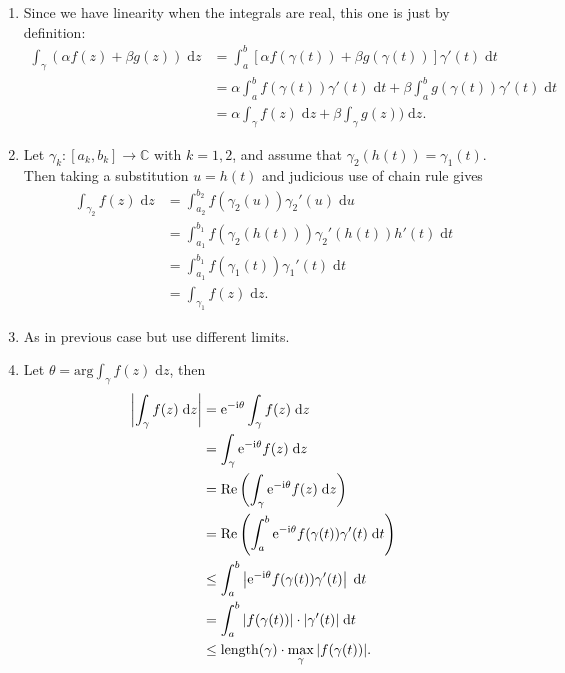 \documentclass[letter-paper]{tufte-book}
\newenvironment{proof}[1][Proof]{\begin{trivlist}
\item[\hskip \labelsep {\bfseries #1}]}{\end{trivlist}}
\newcommand{\ex}{\mathrm{e}}
\newcommand{\zi}{{\rm i}}
\begin{document}
\begin{proof}
  \begin{enumerate}
    \item Since we have linearity when the integrals are real, this one is just
    by definition:
    \begin{align*}
      \int_\gamma (\alpha f(z) + \beta g(z))\; \mathrm{d}z 
        &= \int^b_a [\alpha f(\gamma(t)) + \beta g(\gamma(t))]\gamma'(t)\; \mathrm{d}t\\
        &= \alpha \int^b_a f(\gamma(t)) \gamma'(t)\; \mathrm{d}t + \beta \int^b_a g(\gamma(t)) \gamma'(t)\; \mathrm{d}t\\
        & =\alpha \int_\gamma f(z)\; \mathrm{d}z + \beta \int_\gamma g(z))\; \mathrm{d}z.
    \end{align*}
    
    \item Let $\gamma_k : [a_k, b_k] \to \mathbb{C}$ with $k=1,2$, and assume
    that $\gamma_2(h(t)) = \gamma_1(t)$. Then taking a substitution $u = h(t)$
    and judicious use of chain rule gives
    \begin{align*}
      \int_{\gamma_2} f(z)\; \mathrm{d}z &= \int^{b_2}_{a_2} f(\gamma_2(u)) \gamma_2'(u)\; \mathrm{d}u \\
      &= \int^{b_1}_{a_1} f(\gamma_2(h(t))) \gamma_2'(h(t)) h'(t)\; \mathrm{d}t \\
      &= \int^{b_1}_{a_1} f(\gamma_1(t)) \gamma_1'(t)\; \mathrm{d}t \\
      &= \int_{\gamma_1} f(z)\; \mathrm{d}z.
    \end{align*}
    
    \item As in previous case but use different limits.
    
    \item Let $\theta = \mbox{arg} \int_\gamma f(z)\; \mathrm{d}z$, then
    \begin{align*}
      \left|\int_\gamma f(z)\; \mathrm{d}z\right| &= \ex^{-\zi \theta} \int_\gamma f(z)\; \mathrm{d}z \\
      &= \int_\gamma \ex^{-\zi \theta} f(z)\; \mathrm{d}z \\
      &= \mbox{Re} \left(\int_\gamma \ex^{-\zi \theta} f(z)\; \mathrm{d}z\right) \\
      &= \mbox{Re} \left(\int^b_a \ex^{-\zi \theta} f(\gamma(t)) \gamma'(t)\; \mathrm{d}t\right)\\
      &\leq \int^b_a \left|\ex^{-\zi \theta} f(\gamma(t)) \gamma'(t)\right|\; \mathrm{d}t \\
      &= \int^b_a |f(\gamma(t))| \cdot |\gamma'(t)|\; \mathrm{d}t\\
      &\leq \textnormal{length}(\gamma) \cdot \max_{\gamma} |f(\gamma(t))|.
    \end{align*}
    

\end{enumerate}
\end{proof}
\end{document}
